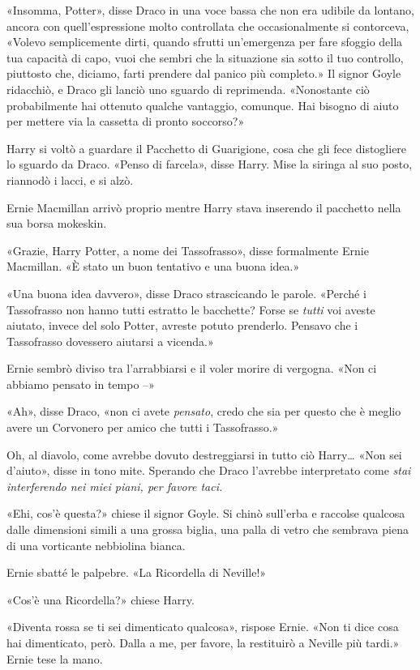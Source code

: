 «Insomma, Potter», disse Draco in una voce bassa che non era udibile da lontano, ancora con quell’espressione molto controllata che occasionalmente si contorceva, «Volevo semplicemente dirti, quando sfrutti un’emergenza per fare sfoggio della tua capacità di capo, vuoi che sembri che la situazione sia sotto il tuo controllo, piuttosto che, diciamo, farti prendere dal panico più completo.» Il signor Goyle ridacchiò, e Draco gli lanciò uno sguardo di reprimenda. «Nonostante ciò probabilmente hai ottenuto qualche vantaggio, comunque. Hai bisogno di aiuto per mettere via la cassetta di pronto soccorso?»

Harry si voltò a guardare il Pacchetto di Guarigione, cosa che gli fece distogliere lo sguardo da Draco. «Penso di farcela», disse Harry. Mise la siringa al suo posto, riannodò i lacci, e si alzò.

Ernie Macmillan arrivò proprio mentre Harry stava inserendo il pacchetto nella sua borsa mokeskin.

«Grazie, Harry Potter, a nome dei Tassofrasso», disse formalmente Ernie Macmillan. «È stato un buon tentativo e una buona idea.»

«Una buona idea davvero», disse Draco strascicando le parole. «Perché i Tassofrasso non hanno tutti estratto le bacchette? Forse se \textit{tutti} voi aveste aiutato, invece del solo Potter, avreste potuto prenderlo. Pensavo che i Tassofrasso dovessero aiutarsi a vicenda.»

Ernie sembrò diviso tra l’arrabbiarsi e il voler morire di vergogna. «Non ci abbiamo pensato in tempo –»

«Ah», disse Draco, «non ci avete \textit{pensato}, credo che sia per questo che è meglio avere un Corvonero per amico che tutti i Tassofrasso.»

Oh, al diavolo, come avrebbe dovuto destreggiarsi in tutto ciò Harry… «Non sei d’aiuto», disse in tono mite. Sperando che Draco l’avrebbe interpretato come \textit{stai interferendo nei miei piani, per favore taci.}

«Ehi, cos’è questa?» chiese il signor Goyle. Si chinò sull’erba e raccolse qualcosa dalle dimensioni simili a una grossa biglia, una palla di vetro che sembrava piena di una vorticante nebbiolina bianca.

Ernie sbatté le palpebre. «La Ricordella di Neville!»

«Cos’è una Ricordella?» chiese Harry.

«Diventa rossa se ti sei dimenticato qualcosa», rispose Ernie. «Non ti dice cosa hai dimenticato, però. Dalla a me, per favore, la restituirò a Neville più tardi.» Ernie tese la mano.

